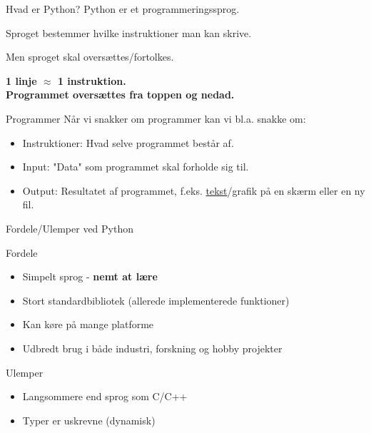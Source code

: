 \documentclass{beamer}
\begin{document}
\begin{frame}{Hvad er Python?}
Python er et programmeringssprog.

Sproget bestemmer hvilke instruktioner man kan skrive.

Men sproget skal oversættes/fortolkes.

\pause
\begin{center}
\textbf{1 linje $\approx$ 1 instruktion. \\
	Programmet oversættes fra toppen og nedad.}
\end{center}
\end{frame}



\begin{frame}{Programmer}
Når vi snakker om programmer kan vi bl.a. snakke om:
\begin{itemize}
	\item Instruktioner: Hvad selve programmet består af.
	\pause
	\item Input: "Data" som programmet skal forholde sig til.
	\pause
	\item Output: Resultatet af programmet, f.eks. \underline{tekst}/grafik på en skærm eller en ny fil.
\end{itemize}

\end{frame}



\begin{frame}{Fordele/Ulemper ved Python}
\begin{exampleblock}{Fordele}
\begin{itemize}
\item Simpelt sprog - \textbf{nemt at lære}
\item Stort standardbibliotek (allerede implementerede funktioner)
\item Kan køre på mange platforme
\item Udbredt brug i både industri, forskning og hobby projekter
\end{itemize}
\end{exampleblock}

\begin{alertblock}{Ulemper}
\begin{itemize}
\item Langsommere end sprog som C/C++
\item Typer er uskrevne (dynamisk)
\end{itemize}
\end{alertblock}
\end{frame}
\end{document}

